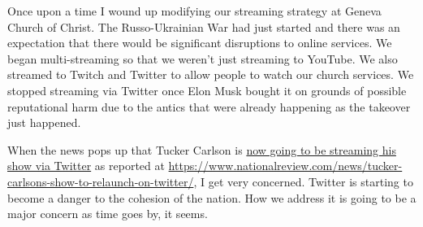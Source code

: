 Once upon a time I wound up modifying our streaming strategy at Geneva
Church of Christ. The Russo-Ukrainian War had just started and there was
an expectation that there would be significant disruptions to online
services. We began multi-streaming so that we weren't just streaming to
YouTube. We also streamed to Twitch and Twitter to allow people to watch
our church services. We stopped streaming via Twitter once Elon Musk
bought it on grounds of possible reputational harm due to the antics
that were already happening as the takeover just happened.

When the news pops up that Tucker Carlson is
\href{https://archive.ph/LDxYX}{now going to be streaming his show via
Twitter} as reported at
\url{https://www.nationalreview.com/news/tucker-carlsons-show-to-relaunch-on-twitter/},
I get very concerned. Twitter is starting to become a danger to the
cohesion of the nation. How we address it is going to be a major concern
as time goes by, it seems.
